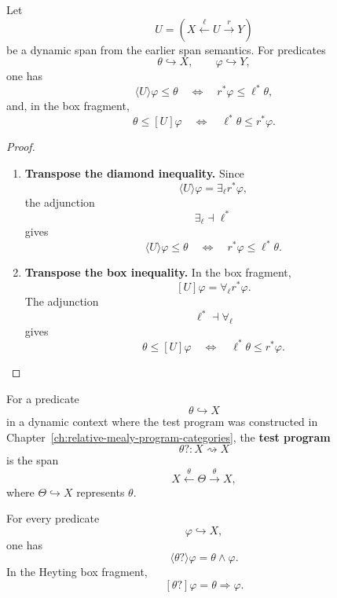 \begin{proposition}
\label{prop:adjoint-rules-span-modalities}
Let
\[
  U=(X\xleftarrow{\ell}U\xrightarrow{r}Y)
\]
be a dynamic span from the earlier span semantics.  For predicates
\[
  \theta\hookrightarrow X,
  \qquad
  \varphi\hookrightarrow Y,
\]
one has
\[
  \langle U\rangle\varphi\leq \theta
  \quad\Longleftrightarrow\quad
  r^*\varphi\leq \ell^*\theta,
\]
and, in the box fragment,
\[
  \theta\leq [U]\varphi
  \quad\Longleftrightarrow\quad
  \ell^*\theta\leq r^*\varphi.
\]
\end{proposition}

\begin{proof}
\leavevmode
\begin{enumerate}
  \item \textbf{Transpose the diamond inequality.}
  Since
  \[
    \langle U\rangle\varphi=\exists_{\ell}r^*\varphi,
  \]
  the adjunction
  \[
    \exists_{\ell}\dashv \ell^*
  \]
  gives
  \[
    \langle U\rangle\varphi\leq \theta
    \quad\Longleftrightarrow\quad
    r^*\varphi\leq \ell^*\theta.
  \]

  \item \textbf{Transpose the box inequality.}
  In the box fragment,
  \[
    [U]\varphi=\forall_{\ell}r^*\varphi.
  \]
  The adjunction
  \[
    \ell^*\dashv\forall_{\ell}
  \]
  gives
  \[
    \theta\leq [U]\varphi
    \quad\Longleftrightarrow\quad
    \ell^*\theta\leq r^*\varphi.
  \]
\end{enumerate}
\end{proof}

\begin{definition}[Tests]
\label{def:dynamic-tests}
For a predicate
\[
  \theta\hookrightarrow X
\]
in a dynamic context where the test program was constructed in
Chapter~\ref{ch:relative-mealy-program-categories},
the \textbf{test program}
\[
  \theta?:X\rightsquigarrow X
\]
is the span
\[
  X\xleftarrow{\theta}\Theta\xrightarrow{\theta}X,
\]
where \(\Theta\hookrightarrow X\) represents \(\theta\).
\end{definition}

\begin{proposition}
\label{prop:test-laws}
For every predicate
\[
  \varphi\hookrightarrow X,
\]
one has
\[
  \langle\theta?\rangle\varphi
  =
  \theta\wedge\varphi.
\]
In the Heyting box fragment,
\[
  [\theta?]\varphi
  =
  \theta\Rightarrow\varphi.
\]
\end{proposition}


